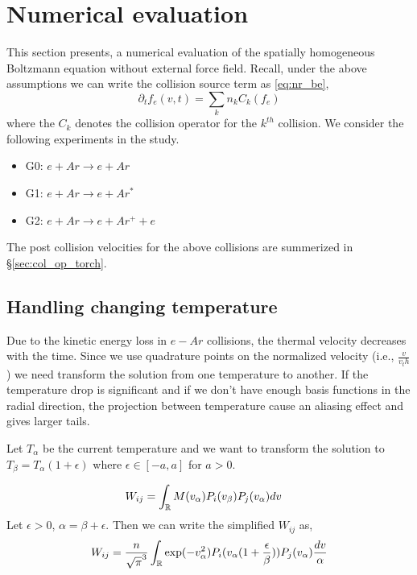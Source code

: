 \documentclass{article}
\begin{document}
\newpage
\section{Numerical evaluation}
This section presents, a numerical evaluation of the spatially homogeneous Boltzmann equation without external force field. Recall, under the above assumptions we can write the collision source term as \eqref{eq:nr_be}, 
\begin{equation}
	\partial_t f_e(v,t) = \sum_{k} n_k C_k(f_e) \label{eq:nr_be}
\end{equation} where the $C_k$ denotes the collision operator for the $k^{th}$ collision. We consider the following experiments in the study. 
\begin{itemize}
\item G0: $e + Ar \rightarrow e + Ar $ 
\item G1: $e + Ar \rightarrow e + Ar^*$
\item G2: $e + Ar \rightarrow e + Ar^+ + e$ 
\end{itemize} The post collision velocities for the above collisions are summerized in \S\ref{sec:col_op_torch}.


\subsection{Handling changing temperature}
Due to the kinetic energy loss in $e-Ar$ collisions, the thermal velocity decreases with the time. Since we use quadrature points on the normalized velocity (i.e., $\frac{v}{v_th}$) we need transform the solution from one temperature to another. If the temperature drop is significant and if we don't have enough basis functions in the radial direction, the projection between temperature cause an aliasing effect and gives larger tails. 

Let $T_\alpha$ be the current temperature and we want to transform the solution to $T_\beta=T_\alpha (1+ \epsilon)$ where $\epsilon \in [-a,a]$ for $a>0$.

\begin{align}
W_{ij} &= \int_{\mathbb{R}} M(v_\alpha) P_i(v_\beta) P_j(v_\alpha)dv \label{eq:basis_change}
\end{align}
Let $\epsilon >0$, $\alpha = \beta + \epsilon$. Then we can write the simplified $W_{ij}$ as, 
\begin{align}
W_{ij} &= \frac{n}{\sqrt{\pi}^{3}}  \int_{\mathbb{R}}  \exp(-v_\alpha^2) P_i (v_\alpha (1 + \frac{\epsilon}{\beta})) P_j(v_\alpha) \frac{dv}{\alpha} \\
\end{align}
\end{document}

